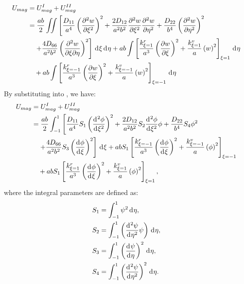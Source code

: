 \documentclass[preprint,12pt]{elsarticle}
\newcommand{\id}{\mathrm{d}\mkern1mu}
\begin{document}
\begin{equation}\label{eq:poten_energy_tolx}
	\begin{split}
		U_{mag} &= U^{I}_{mag} + U^{II}_{mag} \\
		&= \frac{ab}{2} \iint \left[ \frac{D_{11}}{a^4} \left( \frac{\partial^2 w}{\partial \xi^2} \right)^2 + \frac{2 D_{12}}{a^2 b^2} \frac{\partial^2 w}{\partial \xi^2} \frac{\partial^2 w}{\partial \eta^2} + \frac{D_{22}}{b^4} \left( \frac{\partial^2 w}{\partial \eta^2} \right)^2 \right. \\
		&\quad \left.  + \frac{4 D_{66}}{a^2 b^2} \left( \frac{\partial^2 w}{\partial \xi \partial \eta} \right)^2 \right] \, \id\xi \, \id\eta + ab \int \left[\frac{k^r_{\xi=1}}{a^3} \left( \frac{\partial w}{\partial \xi} \right)^2 + \frac{k^v_{\xi=1}}{a} \left( w \right)^2 \right]_{\xi=1} \, \id \eta \\
		&\quad  + ab \int \left[\frac{k^r_{\xi=-1}}{a^3} \left( \frac{\partial w}{\partial \xi} \right)^2 + \frac{k^v_{\xi=-1}}{a} \left( w \right)^2 \right]_{\xi=-1} \, \id \eta
	\end{split}
\end{equation}
%
By substituting  into , we have:
%
\begin{equation}\label{eq:poten_energy_tolx2}
	\begin{split}
		U_{mag}&=U^{I}_{mag}+U^{II}_{mag}\\
		&=\frac{ab}{2} \int_{-1}^{1} \left[ \frac{D_{11}}{a^4}S_1 \left( \frac{\id^2\phi }{\id \xi^2} \right)^2 + \frac{2 D_{12}}{a^2 b^2}S_2 \frac{\id^2\phi }{\id \xi^2}\phi  + \frac{D_{22}}{b^4}S_4  \phi^2 \right. \\
		&\quad \left. + \frac{4 D_{66}}{a^2 b^2}S_3 \left( \frac{\id \phi }{\id \xi}\right)^2 \right] \, \id\xi +abS_1 \left[\frac{k^r_{\xi=-1}}{a^3} \left( \frac{\id \phi}{\id \xi} \right)^2+ \frac{k^v_{\xi=-1}}{a} \left( \phi \right)^2\right]_{\xi=-1}\\
		&\quad+abS_1 \left[\frac{k^r_{\xi=1}}{a^3} \left( \frac{\id \phi}{\id \xi} \right)^2+ \frac{k^v_{\xi=1}}{a} \left( \phi \right)^2\right]_{\xi=1},
	\end{split}
\end{equation}
%
where the integral parameters are defined as:
%
\begin{equation}\label{eq:inte_phi_text}  
	\begin{split}  
		&S_1 = \int_{-1}^{1} \psi^2 \, \id\eta, \\  
		&S_2 = \int_{-1}^{1} \left( \frac{\id^2 \psi}{\id \eta^2} \psi \right) \, \id\eta, \\  
		&S_3 = \int_{-1}^{1} \left( \frac{\id \psi}{\id \eta} \right)^2 \, \id\eta, \\  
		&S_4 = \int_{-1}^{1} \left( \frac{\id^2 \psi}{\id \eta^2} \right)^2 \, \id\eta.  
	\end{split}  
\end{equation}   
\end{document}
